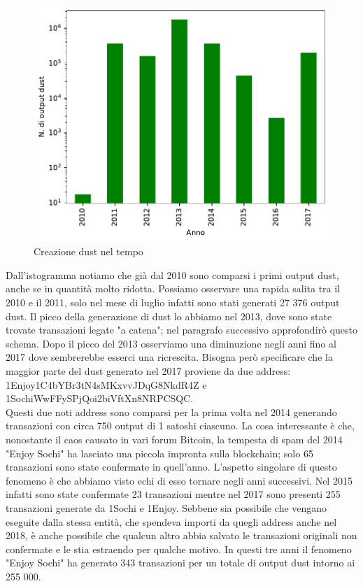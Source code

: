 \begin{figure}[h!]
    \centering
    \includegraphics[scale=0.9]{Grafici/dust_created_year.pdf}
    \caption{Creazione dust nel tempo}
    \label{fig:dust_created}
\end{figure}
\FloatBarrier 
Dall'istogramma notiamo che già dal 2010 sono comparsi i primi output dust, anche se in quantità molto ridotta. Possiamo osservare una rapida salita tra il 2010 e il 2011, solo nel mese di luglio infatti sono stati generati 27 376 output dust.
Il picco della generazione di dust lo abbiamo nel 2013, dove sono state trovate transazioni legate "a catena"; nel paragrafo successivo approfondirò questo schema. Dopo il picco del 2013 osserviamo una diminuzione negli anni fino al 2017 dove sembrerebbe esserci una ricrescita. Bisogna però specificare che la maggior parte del dust generato nel 2017 proviene da due address: 1Enjoy1C4bYBr3tN4sMKxvvJDqG8NkdR4Z e 1SochiWwFFySPjQoi2biVftXn8NRPCSQC.\\Questi due noti address sono comparsi per la prima volta nel 2014 generando transazioni con circa 750 output di 1 satoshi ciascuno. La cosa interessante è che, nonostante il caos causato in vari forum Bitcoin, la tempesta di spam del 2014 "Enjoy Sochi" ha lasciato una piccola impronta sulla blockchain; solo 65 transazioni sono state confermate in quell'anno. L'aspetto singolare di questo fenomeno è che abbiamo visto echi di esso tornare negli anni successivi. Nel 2015 infatti sono state confermate 23 transazioni mentre nel 2017 sono presenti 255 transazioni generate da 1Sochi e 1Enjoy. Sebbene sia possibile che vengano eseguite dalla stessa entità, che spendeva importi da quegli address anche nel 2018, è anche possibile che qualcun altro abbia salvato le transazioni originali non confermate e le stia estraendo per qualche motivo. In questi tre anni il fenomeno "Enjoy Sochi" ha generato 343 transazioni per un totale di output dust intorno ai 255 000.\\\\
